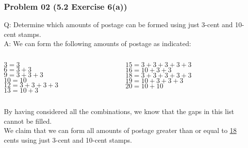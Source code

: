 \documentclass[14pt,hyperref={bookmarks=false}]{beamer}
\begin{document}
	\begin{frame}
	\frametitle{Problem 02 (5.2 Exercise 6(a))}
	\fontsize{9}{10pt}\selectfont
	Q: Determine which amounts of postage can be formed using just 3-cent and 10-cent stamps.\\
    \vspace*{0.1cm}
    A: We can form the following amounts of postage as indicated:\\
    \vspace*{0.3cm}
	\begin{columns}
	\begin{column}{0.4\textwidth}
    $ 3 = 3$\\
    $ 6 = 3 + 3$\\
    $ 9 = 3 + 3 + 3$\\
    $10 = 10$\\
    $12 = 3 + 3 + 3 + 3$\\
    $13 = 10 + 3$\\
	\end{column}
	\begin{column}{0.4\textwidth}
    $15 = 3 + 3 + 3 + 3 + 3$\\
    $16 = 10 + 3 + 3$\\
    $18 = 3 + 3 + 3 + 3  + 3$\\
    $19 = 10 + 3 + 3 + 3$\\
    $20 = 10 + 10$\\
	\end{column}
	\end{columns}
    \vspace*{0.3cm}
    
    By having considered all the combinations, we know that the gaps in this list cannot be filled.\\ We claim that we can form all amounts of postage greater than or equal to \underline{18} cents using just 3-cent and 10-cent stamps.
    
	\end{frame}
\end{document}
